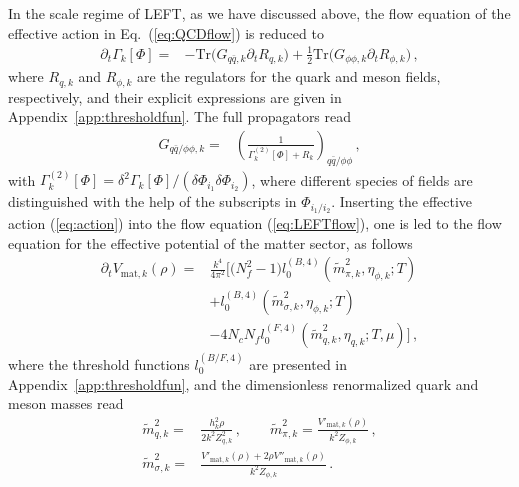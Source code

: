 \documentclass[%
reprint,
superscriptaddress,
showpacs,preprintnumbers,
 amsmath,amssymb,
 aps,
prd,
]{revtex4-1}
\def\Eq#1{Eq.~(\ref{#1})}
\def\eq#1{(\ref{#1})}
\def\app#1{Appendix~\ref{#1}}
\begin{document}
In the scale regime of LEFT, as we have discussed above, the flow equation of the effective action in \Eq{eq:QCDflow} is reduced to 
%
\begin{align}
\partial_t\Gamma_k[\Phi]=&-\mathrm{Tr}\Big(G_{q\bar q,k}\partial_t R_{q,k}\Big)+\frac{1}{2}\mathrm{Tr}\Big(G_{\phi\phi,k}\partial_t R_{\phi,k}\Big)\,,\label{eq:LEFTflow}
\end{align}
%
where $R_{q,k}$ and $R_{\phi,k}$ are the regulators for the quark and meson fields, respectively, and their explicit expressions are given in \app{app:thresholdfun}. The full propagators read
%
\begin{align}
G_{q\bar q/\phi\phi,k}=&\left(\frac{1}{\Gamma^{(2)}_k[\Phi]+R_k}\right)_{q\bar q/\phi\phi}\,,\label{}
\end{align}
%
with $\Gamma^{(2)}_k[\Phi]=\delta^2\Gamma_k[\Phi]/(\delta \Phi_{i_1}\delta \Phi_{i_2})$, where different species of fields are distinguished with the help of the subscripts in $\Phi_{i_1/i_2}$. Inserting the effective action \eq{eq:action} into the flow equation \eq{eq:LEFTflow}, one is led to the flow equation for the effective potential of the matter sector, as follows
%
\begin{align}
  \partial_t V_{\mathrm{mat},k}(\rho)=&\frac{k^4}{4\pi^2} \bigg [\big(N^2_f-1\big) l^{(B,4)}_{0}(\tilde{m}^{2}_{\pi,k},\eta_{\phi,k};T)\nonumber\\[2ex]
&+l^{(B,4)}_{0}(\tilde{m}^{2}_{\sigma,k},\eta_{\phi,k};T)\nonumber\\[2ex]
&-4N_c N_f l^{(F,4)}_{0}(\tilde{m}^{2}_{q,k},\eta_{q,k};T,\mu)\bigg]\,, \label{eq:flowV}
\end{align}
%
where the threshold functions $l^{(B/F,4)}_{0}$ are presented in \app{app:thresholdfun}, and the dimensionless renormalized quark and meson masses read
%
\begin{align}
  \tilde{m}^{2}_{q,k}=&\frac{h^{2}_{k}\rho}{2k^2Z^{2}_{q,k}}\,, \qquad \tilde{m}^{2}_{\pi,k}=\frac{V'_{\mathrm{mat},k}(\rho)}{k^2 Z_{\phi,k}}\,, \\[2ex]
  \tilde{m}^{2}_{\sigma,k}=&\frac{V'_{\mathrm{mat},k}(\rho)+2\rho V''_{\mathrm{mat},k}(\rho)}{k^2 Z_{\phi,k}}\,.\label{}
\end{align}
%
\end{document}
